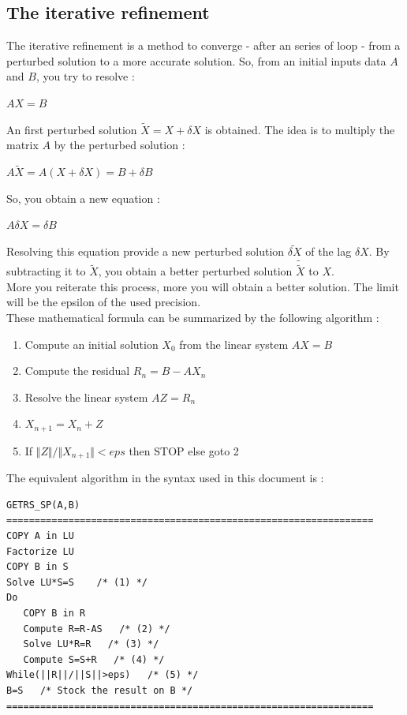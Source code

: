\documentclass{report}
\begin{document}
\subsection{The iterative refinement}
The iterative refinement is a method to converge - after an series of loop - from a perturbed solution to a more accurate solution. So, from an initial inputs data $A$ and $B$, you try to resolve :
\begin{center}
$AX=B$
\end{center}
An first perturbed solution $\tilde{X}=X+\delta{X}$ is obtained. The idea is to multiply the matrix $A$ by the perturbed solution :
\begin{center}
$A\tilde{X}=A(X+\delta{X})=B+\delta{B}$
\end{center}
So, you obtain a new equation :
\begin{center}
$A\delta{X}=\delta{B}$
\end{center}
Resolving this equation provide a new perturbed solution $\widetilde{\delta{X}}$ of the lag $\delta{X}$. By subtracting it to $\tilde{X}$, you obtain a better perturbed solution $\tilde{\tilde{X}}$ to $X$.\\
More you reiterate this process, more you will obtain a better solution. The limit will be the epsilon of the used precision.\\
These mathematical formula can be summarized by the following algorithm :
\begin{enumerate}
\item Compute an initial solution $X_0$ from the linear system $AX=B$
\item Compute the residual $R_n=B-AX_n$
\item Resolve the linear system $AZ=R_n$
\item $X_{n+1}=X_n+Z$
\item If $\Vert{Z}\Vert/\Vert{X_{n+1}}\Vert<eps$ then STOP else goto 2
\end{enumerate}
The equivalent algorithm in the syntax used in this document is :
\begin{verbatim}
GETRS_SP(A,B)
=================================================================
COPY A in LU
Factorize LU
COPY B in S
Solve LU*S=S    /* (1) */
Do
   COPY B in R   
   Compute R=R-AS   /* (2) */
   Solve LU*R=R   /* (3) */
   Compute S=S+R   /* (4) */
While(||R||/||S||>eps)   /* (5) */
B=S   /* Stock the result on B */
=================================================================
\end{verbatim}
\end{document}
